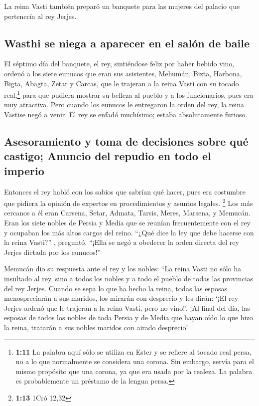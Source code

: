  La reina Vasti también preparó un banquete para las
mujeres del palacio que pertenecía al rey Jerjes.

\hypertarget{wasthi-se-niega-a-aparecer-en-el-saluxf3n-de-baile}{%
\subsection{Wasthi se niega a aparecer en el salón de
baile}\label{wasthi-se-niega-a-aparecer-en-el-saluxf3n-de-baile}}

 El séptimo día del banquete, el rey, sintiéndose feliz
por haber bebido vino, ordenó a los siete eunucos que eran sus
asistentes, Mehumán, Bizta, Harbona, Bigta, Abagta, Zetar y Carcas,
 que le trajeran a la reina Vasti con su tocado
real,\footnote{\textbf{1:11} La palabra aquí sólo se utiliza en Ester y
  se refiere al tocado real persa, no a lo que normalmente se considera
  una corona. Sin embargo, servía para el mismo propósito que una
  corona, ya que era usada por la realeza. La palabra es probablemente
  un préstamo de la lengua persa.} para que pudiera mostrar su belleza
al pueblo y a los funcionarios, pues era muy atractiva. 
Pero cuando los eunucos le entregaron la orden del rey, la reina Vastise
negó a venir. El rey se enfadó muchísimo; estaba absolutamente furioso.

\hypertarget{asesoramiento-y-toma-de-decisiones-sobre-quuxe9-castigo-anuncio-del-repudio-en-todo-el-imperio}{%
\subsection{Asesoramiento y toma de decisiones sobre qué castigo;
Anuncio del repudio en todo el
imperio}\label{asesoramiento-y-toma-de-decisiones-sobre-quuxe9-castigo-anuncio-del-repudio-en-todo-el-imperio}}

 Entonces el rey habló con los sabios que sabrían qué
hacer, pues era costumbre que pidiera la opinión de expertos en
procedimientos y asuntos legales. \footnote{\textbf{1:13} 1Cró 12,32}
 Los más cercanos a él eran Carsena, Setar, Admata,
Tarsis, Meres, Marsena, y Memucán. Eran los siete nobles de Persia y
Media que se reunían frecuentemente con el rey y ocupaban los más altos
cargos del reino.  ``¿Qué dice la ley que debe hacerse
con la reina Vasti?'' , preguntó. ``¡Ella se negó a obedecer la orden
directa del rey Jerjes dictada por los eunucos!''

 Memucán dio su respuesta ante el rey y los nobles: ``La
reina Vasti no sólo ha insultado al rey, sino a todos los nobles y a
todo el pueblo de todas las provincias del rey Jerjes. 
Cuando se sepa lo que ha hecho la reina, todas las esposas
menospreciarán a sus maridos, los mirarán con desprecio y les dirán:
`¡El rey Jerjes ordenó que le trajeran a la reina Vasti, pero no vino!'.
 ¡Al final del día, las esposas de todos los nobles de
toda Persia y de Media que hayan oído lo que hizo la reina, tratarán a
sus nobles maridos con airado desprecio!

